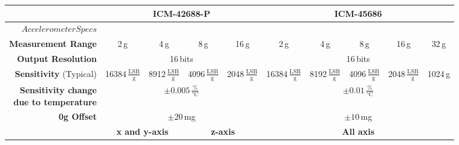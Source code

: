 \documentclass[fontsize=11pt,%
twoside,%
BCOR          = 8mm, %
DIV           = 11,  %
titlepage     = off,%
index=totoc,%
xcolor        = pdftex,%
dvipsnames,%
bibliography  = totoc,%
bibliography = numbered, %
listof        = notnumbered]{scrreprt}
\begin{document}
\begin{table}
	\label{tab:sensor_imu2}
	\begin{adjustbox}{width=1.05\textwidth}		 
		\begin{tabular}{|r||c|c|c|c|c|c|c|c||c|c|c|c|c|c|c|c|c|} \hline		
			& \multicolumn{8}{c||}{\textbf{ICM-42688-P}} & \multicolumn{9}{c|}{\textbf{ICM-45686}}\\ \hline
			
			\rowcolor{light grey} $Accelerometer Specs$ & \multicolumn{17}{c|}{}\\ \hline \hline
			
			\textbf{Measurement Range} & \multicolumn{2}{c|}{2\,g} & \multicolumn{2}{c|}{4\,g} & \multicolumn{2}{c|}{8\,g} & \multicolumn{2}{c||}{16\,g} & \multicolumn{2}{c|}{2\,g} & \multicolumn{2}{c|}{4\,g} & \multicolumn{2}{c|}{8\,g} & \multicolumn{2}{c|}{16\,g} & 32\,g\\ \hline
			
			\textbf{Output Resolution} & \multicolumn{8}{c||}{16\,bits} & \multicolumn{9}{c|}{16\,bits}\\ \hline
			
			\textbf{Sensitivity} (Typical) & \multicolumn{2}{c|}{16384\,$\frac{\text{LSB}}{\text{g}}$} & \multicolumn{2}{c|}{8912\,$\frac{\text{LSB}}{\text{g}}$} & \multicolumn{2}{c|}{4096\,$\frac{\text{LSB}}{\text{g}}$} & \multicolumn{2}{c||}{2048\,$\frac{\text{LSB}}{\text{g}}$} & \multicolumn{2}{c|}{16384\,$\frac{\text{LSB}}{\text{g}}$} & \multicolumn{2}{c|}{8192\,$\frac{\text{LSB}}{\text{g}}$} & \multicolumn{2}{c|}{4096\,$\frac{\text{LSB}}{\text{g}}$} & \multicolumn{2}{c|}{2048\,$\frac{\text{LSB}}{\text{g}}$} & 1024\,g\\ \hline
			
			\shortstack[r]{\textbf{Sensitivity change} \\ \textbf{due to temperature}} & \multicolumn{8}{c||}{$\pm0.005\,\frac{\%}{\text{°C}}$} & \multicolumn{9}{c|}{$\pm0.01\,\frac{\%}{\text{°C}}$} \\ \hline
			
			\textbf{0g Offset} & \multicolumn{8}{c||}{$\pm20$\,mg} & \multicolumn{9}{c|}{$\pm10$\,mg} \\ \hline
			
			\multirowcell{2}{\textbf{Noise}} & \multicolumn{4}{c|}{\textbf{x and y-axis}} & \multicolumn{4}{c||}{\textbf{z-axis}} & \multicolumn{9}{c|}{\textbf{All axis}} \\ \hline
			

\end{tabular}
\end{adjustbox}
\end{table}
\end{document}
